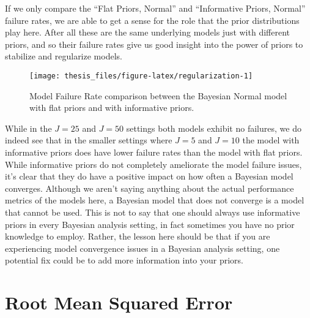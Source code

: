 \documentclass[12pt,twoside]{reedthesis}
\begin{document}
If we only compare the ``Flat Priors, Normal'' and ``Informative Priors, Normal'' failure rates, we are able to get a sense for the role that the prior distributions play here. After all these are the same underlying models just with different priors, and so their failure rates give us good insight into the power of priors to stabilize and regularize models.
\begin{figure}

{\centering \texttt{[image: thesis\_files/figure-latex/regularization-1]} 

}

\caption{Model Failure Rate comparison between the Bayesian Normal model with flat priors and with informative priors.}\label{fig:regularization}
\end{figure}
While in the \(J = 25\) and \(J = 50\) settings both models exhibit no failures, we do indeed see that in the smaller settings where \(J = 5\) and \(J = 10\) the model with informative priors does have lower failure rates than the model with flat priors. While informative priors do not completely ameliorate the model failure issues, it's clear that they do have a positive impact on how often a Bayesian model converges. Although we aren't saying anything about the actual performance metrics of the models here, a Bayesian model that does not converge is a model that cannot be used. This is not to say that one should always use informative priors in every Bayesian analysis setting, in fact sometimes you have no prior knowledge to employ. Rather, the lesson here should be that if you are experiencing model convergence issues in a Bayesian analysis setting, one potential fix could be to add more information into your priors.

\hypertarget{root-mean-squared-error}{%
\section{Root Mean Squared Error}\label{root-mean-squared-error}}
\end{document}

